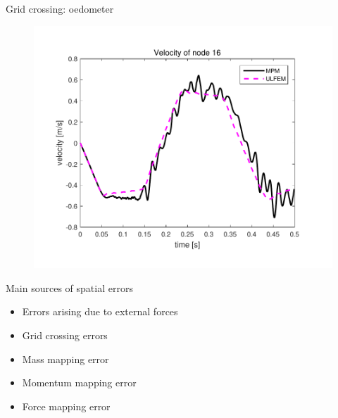 \documentclass[mathserif,professionalfont,hyperref={pdfpagelabels=false}]{beamer}
\begin{document}

\begin{frame}{Grid crossing: oedometer}
\begin{figure}
\includegraphics[scale=0.5]{images/oedometer_vel_30_10}
\end{figure}
\end{frame}



\begin{frame}{Main sources of spatial errors}
\begin{tcolorbox}[colback=blue!5,colframe=blue!40!black,title=Presented today]
\begin{itemize}
\item Errors arising due to external forces
\item Grid crossing errors
\end{itemize}
\end{tcolorbox}
\begin{tcolorbox}[colback=red!5,colframe=red!50!black,title=Other sources]
\begin{itemize}
\item Mass mapping error
\item Momentum mapping error
\item Force mapping error
\end{itemize}
\end{tcolorbox}

\end{frame}
\end{document}
